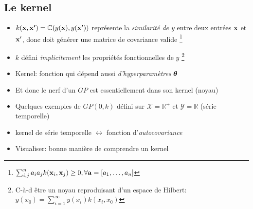 \documentclass[xcolor=svgnames, t]{beamer}
\newcommand{\vectorx}[1]{\boldsymbol{\MakeLowercase{\mathbf{#1}}}}
\newcommand{\coloredemph}[1]{\textcolor{internationalblue}{\emph{#1}}}
\begin{document}
\subsection{Le kernel}
\begin{frame}{\subsecname}
  \begin{itemize}
    \item $k(\vectorx{x}, \vectorx{x^{\prime}}) = \mathbb{C}( y(\vectorx{x}), y(\vectorx{x^\prime}) )$
     représente la \coloredemph{similarité de $y$} entre deux entrées $\vectorx{x}$ et $\vectorx{x}^\prime$,
     donc doit générer une matrice de covariance valide%
     \footnote{
      $\sum_{i,j}^{n} a_i a_j k(\vectorx{x}_i, \vectorx{x}_j) \geq 0, \forall \vectorx{a} = [a_1, \dots, a_n]$
    }
    \pause
    \item $k$ défini \coloredemph{implicitement} les propriétés fonctionnelles de $y$%
    \footnote{
      C-à-d être un noyau reproduisant d'un espace de Hilbert:
      $y(x_0) = \sum_{i=1}^{\infty} y(x_i) k(x_i, x_0)$ 
    }
    \pause
    \item Kernel: fonction qui dépend aussi \coloredemph{d'hyperparamètres} $\vectorx{\theta}$
    \pause
    \item Et donc le nerf d'un $GP$ est essentiellement dans son kernel (noyau)
  \end{itemize}
\end{frame}

\begin{frame}{\subsecname}
  \begin{itemize}
    \item Quelques exemples de $GP(0, k)$ défini sur $\mathcal{X} = \mathbb{R}^+$ et $\mathcal{Y} = \mathbb{R}$
    (série temporelle)
    \item kernel de série temporelle $\leftrightarrow$ fonction d'\coloredemph{autocovariance}
    \item Visualiser: bonne manière de comprendre un kernel
  \end{itemize}  
\end{frame}
\end{document}
